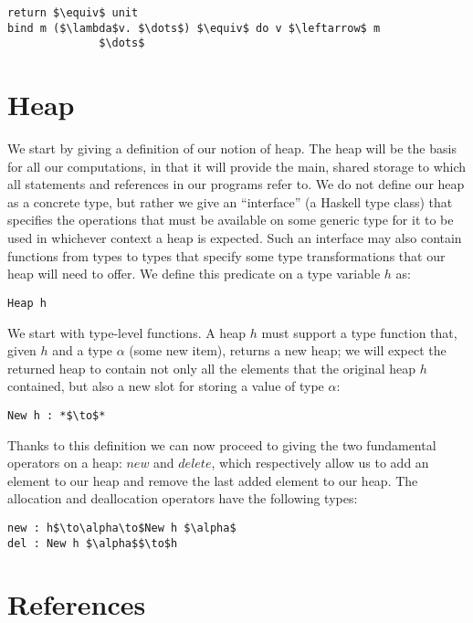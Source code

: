 \documentclass[a4paper]{article}
\begin{document}
\begin{lstlisting}[frame=tb]
return $\equiv$ unit
bind m ($\lambda$v. $\dots$) $\equiv$ do v $\leftarrow$ m 
		      $\dots$
\end{lstlisting}

\section{Heap}

 We start by giving a definition of our notion of heap. The heap will be the basis for all our computations, in that it will provide the main, shared storage to which all statements and references in our programs refer to. We do not define our heap as a concrete type, but rather we give an ``interface'' (a Haskell type class) that specifies the operations that must be available on some generic type for it to be used in whichever context a heap is expected. Such an interface may also contain functions from types to types that specify some type transformations that our heap will need to offer. We define this predicate on a type variable $h$ as:

\begin{lstlisting}
Heap h
\end{lstlisting}

We start with type-level functions. A heap $h$ must support a type function that, given $h$ and a type $\alpha $ (some new item), returns a new heap; we will expect the returned heap to contain not only all the elements that the original heap $h$ contained, but also a new slot for storing a value of type $\alpha $:

\begin{lstlisting}
New h : *$\to$*
\end{lstlisting}

Thanks to this definition we can now proceed to giving the two fundamental operators on a heap: $new$ and $delete$, which respectively allow us to add an element to our heap and remove the last added element to our heap. The allocation and deallocation operators have the following types:

\begin{lstlisting}
new : h$\to\alpha\to$New h $\alpha$
del : New h $\alpha$$\to$h
\end{lstlisting}

\section{References}
\end{document}
